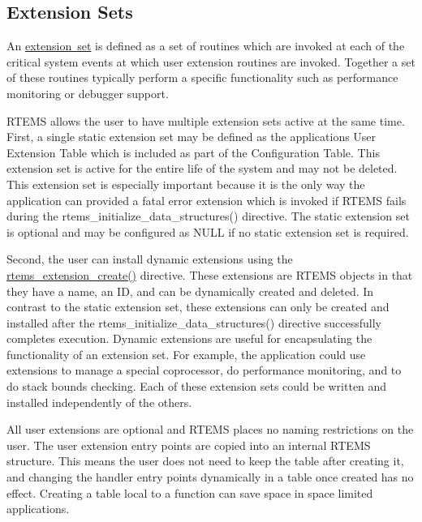 \hypertarget{group__ClassicUserExtensions_ClassicUserExtensionsSets}{}\subsection{Extension Sets}\label{group__ClassicUserExtensions_ClassicUserExtensionsSets}
An \mbox{\hyperlink{structUser__extensions__Table}{extension set}} is defined as a set of routines which are invoked at each of the critical system events at which user extension routines are invoked. Together a set of these routines typically perform a specific functionality such as performance monitoring or debugger support.

R\+T\+E\+MS allows the user to have multiple extension sets active at the same time. First, a single static extension set may be defined as the application\textquotesingle{}s User Extension Table which is included as part of the Configuration Table. This extension set is active for the entire life of the system and may not be deleted. This extension set is especially important because it is the only way the application can provided a fatal error extension which is invoked if R\+T\+E\+MS fails during the rtems\+\_\+initialize\+\_\+data\+\_\+structures() directive. The static extension set is optional and may be configured as {\ttfamily N\+U\+LL} if no static extension set is required.

Second, the user can install dynamic extensions using the \mbox{\hyperlink{group__ClassicUserExtensions_gafcf5ccf8b70f2967ffbf8b493e278fbf}{rtems\+\_\+extension\+\_\+create()}} directive. These extensions are R\+T\+E\+MS objects in that they have a name, an ID, and can be dynamically created and deleted. In contrast to the static extension set, these extensions can only be created and installed after the rtems\+\_\+initialize\+\_\+data\+\_\+structures() directive successfully completes execution. Dynamic extensions are useful for encapsulating the functionality of an extension set. For example, the application could use extensions to manage a special coprocessor, do performance monitoring, and to do stack bounds checking. Each of these extension sets could be written and installed independently of the others.

All user extensions are optional and R\+T\+E\+MS places no naming restrictions on the user. The user extension entry points are copied into an internal R\+T\+E\+MS structure. This means the user does not need to keep the table after creating it, and changing the handler entry points dynamically in a table once created has no effect. Creating a table local to a function can save space in space limited applications.

